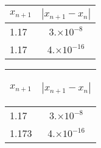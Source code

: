 \documentclass[table,x11names]{book}
\begin{document}
\begin{sideways}
\begin{tabular}{lc}
$x_{n+1}$ &$|x_{n+1}-x_n|$\\ \hline
\cellcolor[gray]{0.80} 1.17 & 3.$\times10^{-8}$\\
1.17 & 4.$\times10^{-16}$\\ \hline
\end{tabular}
\end{sideways}

\begin{tabular}{lc}
$x_{n+1}$ &\begin{sideways}$|x_{n+1}-x_n|$\end{sideways}\\ \hline
\cellcolor[gray]{0.80} 1.17 & 3.$\times10^{-8}$\\
1.173 & 4.$\times10^{-16}$\\ \hline
\end{tabular}
\end{document}
